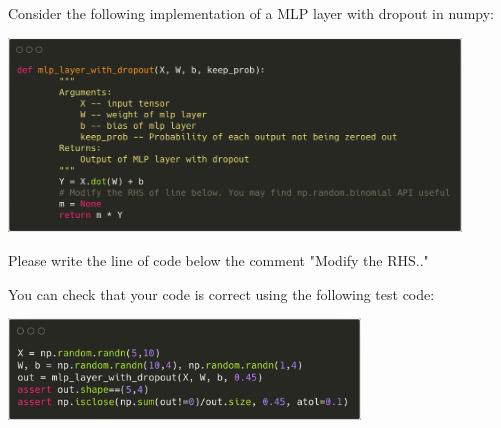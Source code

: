 \begin{frame}
\section{}
Consider the following implementation of a MLP layer with dropout in numpy:

\includegraphics[width=0.9\textwidth]{images/quiz_4_4_3_2a.png}

Please write the line of code below the comment "Modify the RHS.."

You can check that your code is correct using the following test code:

\includegraphics[width=0.7\textwidth]{images/quiz_4_4_3_2b.png}


\end{frame}


